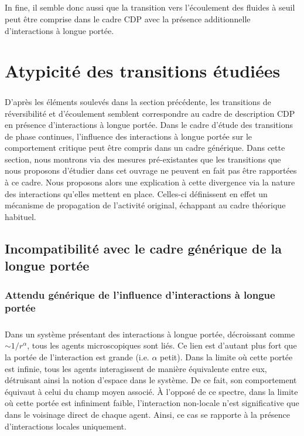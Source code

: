 \subparagraph{}In fine, il semble donc aussi que la transition vers l'écoulement des fluides à seuil peut être comprise dans le cadre CDP avec la présence additionnelle d'interactions à longue portée.

\section{Atypicité des transitions étudiées}

\subparagraph{}D'après les éléments soulevés dans la section précédente, les transitions de réversibilité et d'écoulement semblent correspondre au cadre de description CDP en présence d'interactions à longue portée. Dans le cadre d'étude des transitions de phase continues, l'influence des interactions à longue portée sur le comportement critique peut être compris dans un cadre générique. Dans cette section, nous montrons via des mesures pré-existantes que les transitions que nous proposons d'étudier dans cet ouvrage ne peuvent en fait pas être rapportées à ce cadre. Nous proposons alors une explication à cette divergence via la nature des interactions qu'elles mettent en place. Celles-ci définissent en effet un mécanisme de propagation de l'activité original, échappant au cadre théorique habituel.

\subsection{Incompatibilité avec le cadre générique de la longue portée}

\subsubsection{Attendu générique de l'influence d'interactions à longue portée}

\subparagraph{}Dans un système présentant des interactions à longue portée, décroissant comme ${\sim 1/r^\alpha}$, tous les agents microscopiques sont liés. Ce lien est d'autant plus fort que la portée de l'interaction est grande (i.e. $\alpha$ petit). Dans la limite où cette portée est infinie, tous les agents interagissent de manière équivalente entre eux, détruisant ainsi la notion d'espace dans le système. De ce fait, son comportement équivaut à celui du champ moyen associé. \`A l'opposé de ce spectre, dans la limite où cette portée est infiniment faible, l'interaction non-locale n'est significative que dans le voisinage direct de chaque agent. Ainsi, ce cas se rapporte à la présence d'interactions locales uniquement.

